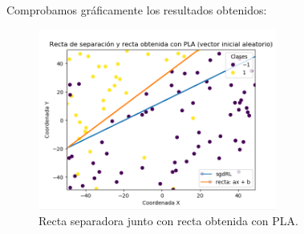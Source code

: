 \documentclass[size=a4, parskip=half, titlepage=false, toc=flat, toc=bib, 12pt]{scrartcl}
\begin{document}
Comprobamos gráficamente los resultados obtenidos:
\begin{figure}[H]
\centering
{}
\includegraphics[width=0.7\textwidth]{./img/2a2}
\caption{Recta separadora junto con recta obtenida con PLA.}
\end{figure}
\end{document}
